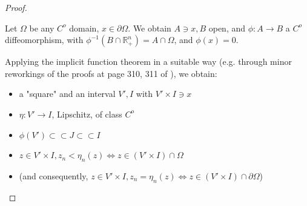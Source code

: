 \documentclass[english,a4paper,9pt,oneside]{scrbook}	%
\theoremstyle{break}
\newenvironment{mproof}[1][\proofname]{%
  \begin{proof}[#1]$ $\par\nobreak\ignorespaces
}{%
  \end{proof}
}
\renewcommand*{\proofname}{Proof}
\theoremstyle{remark}
\newcommand{\mR}{\mathbb{R}}
\newcommand{\cc}{\subset\subset}
\begin{document}
\begin{mproof}
Let $\Omega$ be any $C^o$ domain, $x\in \partial \Omega$. We obtain $A\ni x, B$ open, and $\phi: A\rightarrow B$ a $C^o$ diffeomorphism, with $\phi^{-1}(B\cap \mR^n_+)=A\cap \Omega$, and $\phi(x)=0$.
%
%
%
%
%
%
%
%

Applying the implicit function theorem in a suitable way (e.g. through minor reworkings of the proofs at page 310, 311 of \cite{gilardi2}), we obtain:

\begin{itemize}
	\item a "square" and an interval $V', I$ with $V'\times I \ni x$
	\item $\eta: V'\rightarrow I$, Lipschitz, of class $C^o$
	\item $\phi(V') \cc J \cc I$
	\item $z \in V'\times I, z_n<\eta_n(z) \iff z \in (V'\times I)\cap \Omega$
	\item (and consequently, $z \in V'\times I, z_n=\eta_n(z) \iff z \in (V'\times I)\cap \partial \Omega$)
\end{itemize}


\end{mproof}
\end{document}

